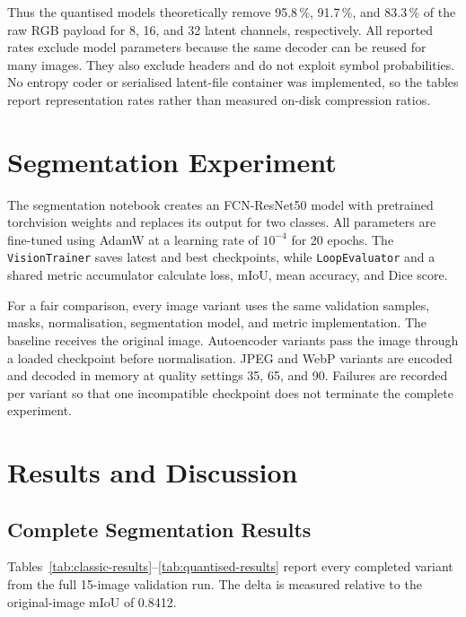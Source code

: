 \documentclass[10pt,a4paper]{article}
\begin{document}
Thus the quantised models theoretically remove 95.8\,\%, 91.7\,\%, and
83.3\,\% of the raw RGB payload for 8, 16, and 32 latent channels,
respectively. All reported rates exclude model parameters because the same
decoder can be reused for many images. They also exclude headers and do not
exploit symbol probabilities. No entropy coder or serialised latent-file
container was implemented, so the tables report representation rates rather
than measured on-disk compression ratios.

\section{Segmentation Experiment}

The segmentation notebook creates an FCN-ResNet50 model with pretrained
torchvision weights and replaces its output for two classes. All parameters
are fine-tuned using AdamW at a learning rate of \(10^{-4}\) for 20 epochs.
The \texttt{VisionTrainer} saves latest and best checkpoints, while
\texttt{LoopEvaluator} and a shared metric accumulator calculate loss, mIoU,
mean accuracy, and Dice score.

For a fair comparison, every image variant uses the same validation samples,
masks, normalisation, segmentation model, and metric implementation. The
baseline receives the original image. Autoencoder variants pass the image
through a loaded checkpoint before normalisation. JPEG and WebP variants are
encoded and decoded in memory at quality settings 35, 65, and 90. Failures are
recorded per variant so that one incompatible checkpoint does not terminate
the complete experiment.

\section{Results and Discussion}

\subsection{Complete Segmentation Results}

Tables~\ref{tab:classic-results}--\ref{tab:quantised-results} report every
completed variant from the full 15-image validation run. The delta is measured
relative to the original-image mIoU of 0.8412.
\end{document}
